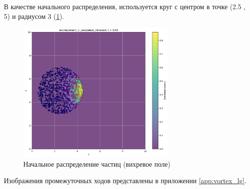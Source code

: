 В качестве начального распределения, используется круг с центром в точке (2.5 , 5) и радиусом 3 (\ref{fig:lg_vortex_begin}).
\begin{figure}
	\centering
	\includegraphics[width=0.7\textwidth]{imgs/lg/эксперимент_1:_вихревое_течение_t0.00.png}
	\caption{Начальное распределение частиц (вихревое поле)}
	\label{fig:lg_vortex_begin}
\end{figure}

Изображения промежуточных ходов представлены в приложении \ref{app:vortex_lg}.

